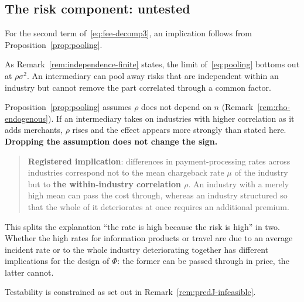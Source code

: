 \subsection{The risk component: untested}
\label{sec:pred-J}

For the second term of~\eqref{eq:fee-decomp3}, an implication follows from
Proposition~\ref{prop:pooling}.

As Remark~\ref{rem:independence-finite} states, the limit of~\eqref{eq:pooling} bottoms out at
$\rho\sigma^2$. An intermediary can pool away risks that are independent within an industry
but cannot remove the part correlated through a common factor.

Proposition~\ref{prop:pooling} assumes $\rho$ does not depend on $n$
(Remark~\ref{rem:rho-endogenous}). If an intermediary takes on industries with higher
correlation as it adds merchants, $\rho$ rises and the effect appears more strongly than
stated here. \textbf{Dropping the assumption does not change the sign.}

\begin{quote}
\textbf{Registered implication}: differences in payment-processing rates across industries
correspond not to the mean chargeback rate $\mu$ of the industry but to
\textbf{the within-industry correlation $\rho$}. An industry with a merely high mean can pass
the cost through, whereas an industry structured so that the whole of it deteriorates at once
requires an additional premium.
\end{quote}

This splits the explanation ``the rate is high because the risk is high'' in two. Whether the
high rates for information products or travel are due to an average incident rate or to the
whole industry deteriorating together has different implications for the design of $\Phi$:
the former can be passed through in price, the latter cannot.

Testability is constrained as set out in Remark~\ref{rem:predJ-infeasible}.

